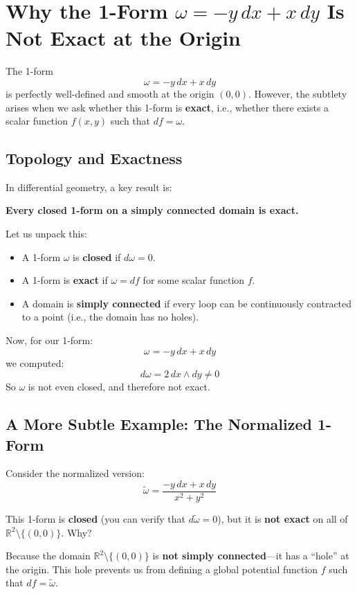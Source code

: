 \documentclass{article}
\begin{document}
	
	\section*{Why the 1-Form \(\omega = -y\,dx + x\,dy\) Is Not Exact at the Origin}
	
	The 1-form
	\[
	\omega = -y\,dx + x\,dy
	\]
	is perfectly well-defined and smooth at the origin \((0,0)\). However, the subtlety arises when we ask whether this 1-form is \textbf{exact}, i.e., whether there exists a scalar function \( f(x, y) \) such that \( df = \omega \).
	
	\subsection*{Topology and Exactness}
	
	In differential geometry, a key result is:
	
	\textbf{Every closed 1-form on a simply connected domain is exact.}
	
	Let us unpack this:
	
	\begin{itemize}
		\item A 1-form \( \omega \) is \textbf{closed} if \( d\omega = 0 \).
		\item A 1-form is \textbf{exact} if \( \omega = df \) for some scalar function \( f \).
		\item A domain is \textbf{simply connected} if every loop can be continuously contracted to a point (i.e., the domain has no holes).
	\end{itemize}
	
	Now, for our 1-form:
	\[
	\omega = -y\,dx + x\,dy
	\]
	we computed:
	\[
	d\omega = 2\,dx \wedge dy \neq 0
	\]
	So \(\omega\) is not even closed, and therefore not exact.
	
	\subsection*{A More Subtle Example: The Normalized 1-Form}
	
	Consider the normalized version:
	\[
	\tilde{\omega} = \frac{-y\,dx + x\,dy}{x^2 + y^2}
	\]
	
	This 1-form is \textbf{closed} (you can verify that \( d\tilde{\omega} = 0 \)), but it is \textbf{not exact} on all of \( \mathbb{R}^2 \setminus \{(0,0)\} \). Why?
	
	Because the domain \( \mathbb{R}^2 \setminus \{(0,0)\} \) is \textbf{not simply connected}—it has a ``hole'' at the origin. This hole prevents us from defining a global potential function \( f \) such that \( df = \tilde{\omega} \).
	
\end{document}
